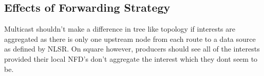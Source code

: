 \subsection{Effects of Forwarding Strategy}
Multicast shouldn't make a difference in tree like topology if interests are aggregated as there is only one upstream node from each route to a data source as defined by NLSR. On square however, producers should see all of the interests provided their local NFD's don't aggregate the interest which they dont seem to be.
